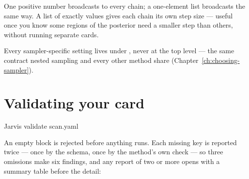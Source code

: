 \begin{keylist}
  \item[proposal\_scale] One positive number broadcasts to every chain; a one-element
        list broadcasts the same way. A list of exactly  values
        gives each chain its own step size --- useful once you know some regions of
        the posterior need a smaller step than others, without running separate
        cards.
\end{keylist}

\begin{jnote}
Every sampler-specific setting lives under , never at the
 top level --- the same contract nested sampling and every other
method share (Chapter~\ref{ch:choosing-sampler}).
\end{jnote}

\section{Validating your card}
\label{sec:toymcmc-validation}

\begin{terminal}
\begin{jcmd}
Jarvis validate scan.yaml
\end{jcmd}
\end{terminal}

An empty  block is rejected before anything runs. Each missing key is
reported twice --- once by the schema, once by the method's own check --- so three
omissions make six findings, and any report of two or more opens with a summary table
before the detail:

